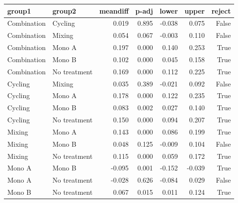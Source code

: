 \begin{tabular}{llrrrrr}
\toprule
group1 & group2 & meandiff & p-adj & lower & upper & reject \\
\midrule
Combination & Cycling & 0.019 & 0.895 & -0.038 & 0.075 & False \\
Combination & Mixing & 0.054 & 0.067 & -0.003 & 0.110 & False \\
Combination & Mono A & 0.197 & 0.000 & 0.140 & 0.253 & True \\
Combination & Mono B & 0.102 & 0.000 & 0.045 & 0.158 & True \\
Combination & No treatment & 0.169 & 0.000 & 0.112 & 0.225 & True \\
Cycling & Mixing & 0.035 & 0.389 & -0.021 & 0.092 & False \\
Cycling & Mono A & 0.178 & 0.000 & 0.122 & 0.235 & True \\
Cycling & Mono B & 0.083 & 0.002 & 0.027 & 0.140 & True \\
Cycling & No treatment & 0.150 & 0.000 & 0.094 & 0.207 & True \\
Mixing & Mono A & 0.143 & 0.000 & 0.086 & 0.199 & True \\
Mixing & Mono B & 0.048 & 0.125 & -0.009 & 0.104 & False \\
Mixing & No treatment & 0.115 & 0.000 & 0.059 & 0.172 & True \\
Mono A & Mono B & -0.095 & 0.001 & -0.152 & -0.039 & True \\
Mono A & No treatment & -0.028 & 0.626 & -0.084 & 0.029 & False \\
Mono B & No treatment & 0.067 & 0.015 & 0.011 & 0.124 & True \\
\bottomrule
\end{tabular}
